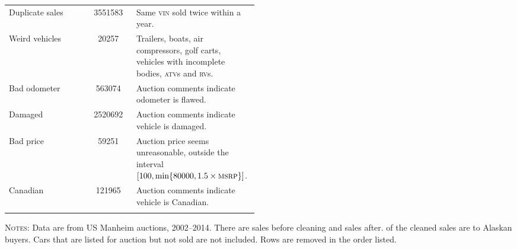 \documentclass[11pt,letterpaper,oneside]{article}
\newcommand{\snippet}[1]{\hspace{-0.15em}}
\begin{document}
\begin{doublespacing}
\begin{table}[!hbt]
\begin{tabular}{l S L{0.493\linewidth}}
    Duplicate sales &
    3551583
    & Same \textsc{vin} sold twice within a year.\\

    \addlinespace

    Weird vehicles &
    20257
    & Trailers, boats, air compressors, golf carts, vehicles with incomplete bodies, \textsc{atv}s and \textsc{rv}s.\\

	\addlinespace

    Bad odometer &
    563074
    & Auction comments indicate odometer is flawed.\\

	\addlinespace

    Damaged &
    2520692
    & Auction comments indicate vehicle is damaged. \\

	\addlinespace

    Bad price &
    59251
    & Auction price seems unreasonable, outside the interval $[100, \min\{80000, 1.5\times \textsc{msrp} \}]$.\\

	\addlinespace

    Canadian &
    121965
    & Auction comments indicate vehicle is Canadian.\\

    \bottomrule
    \addlinespace
\end{tabular}
\footnotesize
\textsc{Notes:} Data are from US Manheim auctions, 2002--2014.
There are \snippet{auctions_uncleaned_total_obs_count.tex} sales before cleaning and \snippet{auctions_cleaned_total_obs_count.tex} sales after.
\snippet{auctions_cleaned_alaska_obs_count.tex} of the cleaned sales are to Alaskan buyers.
Cars that are listed for auction but not sold are not included.
Rows are removed in the order listed.
\end{table}





\end{doublespacing}
\end{document}
